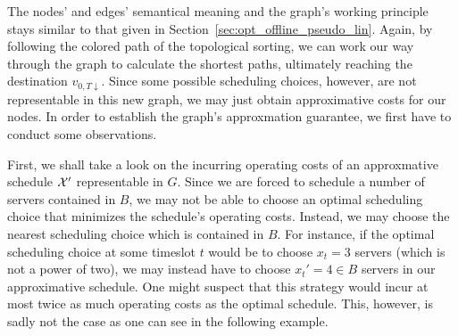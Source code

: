 The nodes' and edges' semantical meaning and the graph's working principle stays similar to that given in Section~\ref{sec:opt_offline_pseudo_lin}. Again, by following the colored path of the topological sorting, we can work our way through the graph to calculate the shortest paths, ultimately reaching the destination $v_{0,T\downarrow}$. Since some possible scheduling choices, however, are not representable in this new graph, we may just obtain approximative costs for our nodes. In order to establish the graph's approxmation guarantee, we first have to conduct some observations.

First, we shall take a look on the incurring operating costs of an approxmative schedule $\mathcal{X}'$ representable in $G$. Since we are forced to schedule a number of servers contained in $B$, we may not be able to choose an optimal scheduling choice that minimizes the schedule's operating costs. Instead, we may choose the nearest scheduling choice which is contained in $B$. For instance, if the optimal scheduling choice at some timeslot $t$ would be to choose $x_t=3$ servers (which is not a power of two), we may instead have to choose $x_t'=4\in B$ servers in our approximative schedule. One might suspect that this strategy would incur at most twice as much operating costs as the optimal schedule. This, however, is sadly not the case as one can see in the following example.
